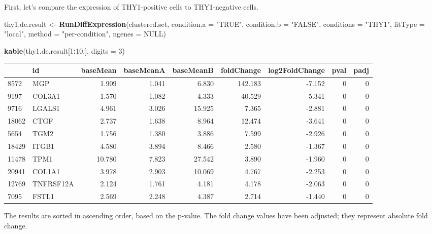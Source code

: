 \documentclass[]{article}
\newenvironment{Shaded}{\begin{snugshade}}{\end{snugshade}}
\newcommand{\DataTypeTok}[1]{\textcolor[rgb]{0.13,0.29,0.53}{#1}}
\newcommand{\DecValTok}[1]{\textcolor[rgb]{0.00,0.00,0.81}{#1}}
\newcommand{\KeywordTok}[1]{\textcolor[rgb]{0.13,0.29,0.53}{\textbf{#1}}}
\newcommand{\NormalTok}[1]{#1}
\newcommand{\OperatorTok}[1]{\textcolor[rgb]{0.81,0.36,0.00}{\textbf{#1}}}
\newcommand{\OtherTok}[1]{\textcolor[rgb]{0.56,0.35,0.01}{#1}}
\newcommand{\StringTok}[1]{\textcolor[rgb]{0.31,0.60,0.02}{#1}}
\begin{document}
First, let's compare the expression of THY1-positive cells to
THY1-negative cells.

\begin{Shaded}
\begin{Highlighting}[]
\NormalTok{thy1.de.result <-}\StringTok{ }\KeywordTok{RunDiffExpression}\NormalTok{(clustered.set, }
                                    \DataTypeTok{condition.a =} \StringTok{"TRUE"}\NormalTok{, }
                                    \DataTypeTok{condition.b =} \StringTok{"FALSE"}\NormalTok{, }
                                    \DataTypeTok{conditions =} \StringTok{"THY1"}\NormalTok{, }
                                    \DataTypeTok{fitType =} \StringTok{"local"}\NormalTok{, }
                                    \DataTypeTok{method =} \StringTok{"per-condition"}\NormalTok{,}
                                    \DataTypeTok{ngenes =} \OtherTok{NULL}\NormalTok{)}
\end{Highlighting}
\end{Shaded}

\begin{Shaded}
\begin{Highlighting}[]
\KeywordTok{kable}\NormalTok{(thy1.de.result[}\DecValTok{1}\OperatorTok{:}\DecValTok{10}\NormalTok{,], }\DataTypeTok{digits =} \DecValTok{3}\NormalTok{)}
\end{Highlighting}
\end{Shaded}

\begin{longtable}[]{@{}llrrrrrrr@{}}
\toprule
& id & baseMean & baseMeanA & baseMeanB & foldChange & log2FoldChange &
pval & padj\tabularnewline
\midrule
\endhead
8572 & MGP & 1.909 & 1.041 & 6.830 & 142.183 & -7.152 & 0 &
0\tabularnewline
9197 & COL3A1 & 1.570 & 1.082 & 4.333 & 40.529 & -5.341 & 0 &
0\tabularnewline
9716 & LGALS1 & 4.961 & 3.026 & 15.925 & 7.365 & -2.881 & 0 &
0\tabularnewline
18062 & CTGF & 2.737 & 1.638 & 8.964 & 12.474 & -3.641 & 0 &
0\tabularnewline
5654 & TGM2 & 1.756 & 1.380 & 3.886 & 7.599 & -2.926 & 0 &
0\tabularnewline
18429 & ITGB1 & 4.580 & 3.894 & 8.466 & 2.580 & -1.367 & 0 &
0\tabularnewline
11478 & TPM1 & 10.780 & 7.823 & 27.542 & 3.890 & -1.960 & 0 &
0\tabularnewline
20941 & COL1A1 & 3.978 & 2.903 & 10.069 & 4.767 & -2.253 & 0 &
0\tabularnewline
12769 & TNFRSF12A & 2.124 & 1.761 & 4.181 & 4.178 & -2.063 & 0 &
0\tabularnewline
7095 & FSTL1 & 2.569 & 2.248 & 4.387 & 2.714 & -1.440 & 0 &
0\tabularnewline
\bottomrule
\end{longtable}

The results are sorted in ascending order, based on the p-value. The
fold change values have been adjusted; they represent absolute fold
change.
\end{document}
